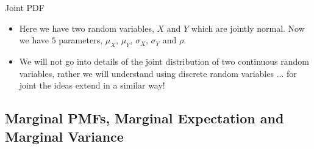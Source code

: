 \documentclass[8pt, usepdftitle = false]{beamer}
\begin{document}
\begin{frame}[allowframebreaks]{Joint PDF}
\begin{itemize}
  \item Here we have two random variables, $X$ and $Y$ which are jointly normal. Now we have $5$ parameters, $\mu_X$, $\mu_Y$, $\sigma_X$, $\sigma_Y$ and $\rho$. 

  \item We will not go into details of the joint distribution of two continuous random variables, rather we will understand using discrete random variables ... for joint the ideas extend in a similar way!







\end{itemize}


\end{frame}


\subsection{Marginal PMFs, Marginal Expectation and Marginal Variance}
\frame{\subsectionpage}










\end{document}
